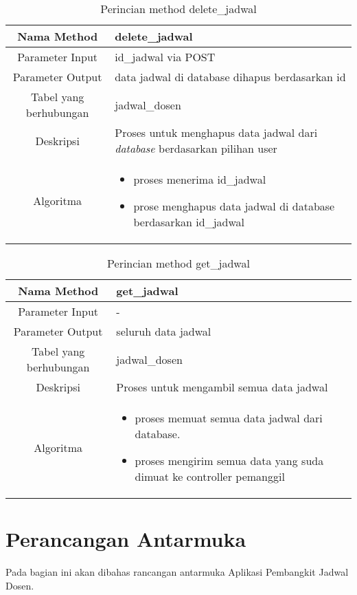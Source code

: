 \begin{center}
\begin{table}[H]
\caption{Perincian method delete\_jadwal}
\begin{tabular}{|c|p{11cm}|}
\hline
Nama Method 	& 	delete\_jadwal 	\\
\hline
Parameter Input & id\_jadwal via POST \\
\hline
Parameter Output & data jadwal di database dihapus berdasarkan id \\
\hline
Tabel yang berhubungan & jadwal\_dosen \\
\hline
Deskripsi	& Proses untuk menghapus data jadwal dari \textit{database} berdasarkan pilihan user \\
\hline
Algoritma	& \begin{itemize}
				\item proses menerima id\_jadwal
				\item prose menghapus data jadwal di database berdasarkan id\_jadwal
				\end{itemize} \\
\hline
\end{tabular}
\end{table}
\end{center}


\begin{center}
\begin{table}[H]
\caption{Perincian method get\_jadwal}
\begin{tabular}{|c|p{11cm}|}
\hline
Nama Method 	& 	get\_jadwal 	\\
\hline
Parameter Input &  - \\
\hline
Parameter Output & seluruh data jadwal \\
\hline
Tabel yang berhubungan & jadwal\_dosen \\
\hline
Deskripsi	& Proses untuk mengambil semua data jadwal \\
\hline
Algoritma	& \begin{itemize}
				\item proses memuat semua data jadwal dari database.
				\item proses mengirim semua data yang suda dimuat ke controller pemanggil
				\end{itemize} \\
\hline
\end{tabular}
\end{table}
\end{center}


\section{Perancangan Antarmuka}
Pada bagian ini akan dibahas rancangan antarmuka Aplikasi Pembangkit Jadwal Dosen.

